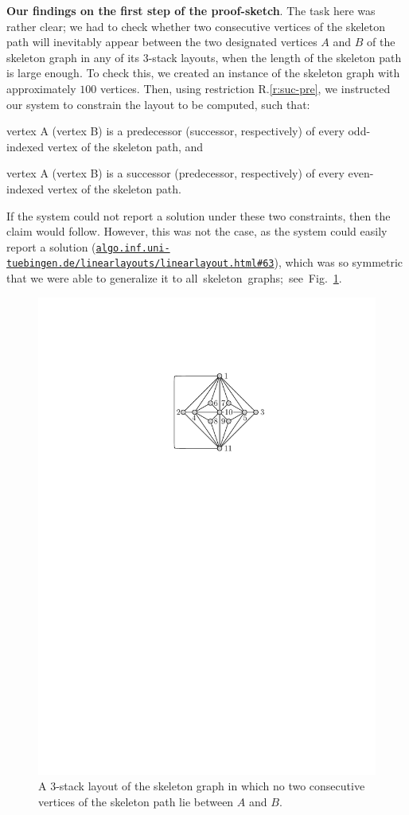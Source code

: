 \documentclass[runningheads]{llncs}
\newcommand{\myparagraph}[1]{\medskip\noindent\textbf{#1}.}
\newcommand\rurl[1]{\href{http://#1}{\nolinkurl{#1}}}
\begin{document}
\myparagraph{Our findings on the first step of the proof-sketch} The task here was rather clear; we had to check whether two consecutive vertices of the skeleton path will inevitably appear between the two designated vertices $A$ and $B$ of the skeleton graph in any of its $3$-stack layouts, when the length of the skeleton path is large enough. 
%
To check this, we created an instance of the skeleton graph with approximately $100$ vertices. Then, using restriction R.\ref{r:suc-pre}, we instructed our system to constrain the layout to be computed, such that: 
%
\begin{inparaenum}[(i)]
\item vertex A (vertex B) is a predecessor (successor, respectively) of every odd-indexed vertex of the skeleton path, and
\item vertex A (vertex B) is a successor (predecessor, respectively) of every even-indexed vertex of the skeleton path.
\end{inparaenum} 
%
If the system could not report a solution under these two constraints, then the claim would follow. However, this was not the case, as the system could easily report a solution (\rurl{algo.inf.uni-tuebingen.de/linearlayouts/linearlayout.html\#63}), which was so symmetric that we were able to generalize it to all~skeleton~graphs;~see~Fig.~\ref{fig:c1}.

\begin{figure}[t]
   \centering
   \includegraphics[width=.80\textwidth,page=8]{graphs}
   \caption{%
   A $3$-stack layout of the skeleton graph in which no two consecutive vertices of the skeleton path lie between $A$ and $B$.}
   \label{fig:c1}
\end{figure}
\end{document}
